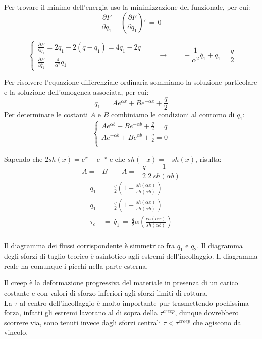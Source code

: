Per trovare il minimo dell'energia uso la minimizzazione del funzionale, per cui:
\begin{equation*}
    \frac{\partial F}{\partial q_1} - \left(  \frac{\partial F}{\partial \dot{q_1}} \right)'\,=\,0
\end{equation*}

\begin{equation*}
    \begin{cases}
          \frac{\partial F}{\partial q_1} = 2q_1-2(q-q_1)=4q_1-2q\\
           \frac{\partial F}{\partial \dot{q_1}}= \frac{4}{\alpha^2} \ddot{q_1} 
    \end{cases}
    \qquad \rightarrow\qquad
    -\frac{1}{\alpha^2} \ddot{q_1} +q_1= \frac{q}{2}
\end{equation*}

Per risolvere l'equazione differenziale ordinaria sommiamo la soluzione particolare e la soluzione dell'omogenea associata, per cui:
\begin{equation*}
    q_1\,=\,Ae^{\alpha x} +Be^{-\alpha x}+\frac{q}{2}
\end{equation*}
Per determinare le costanti $A$ e $B$ combiniamo le condizioni al contorno di $q_1$:
\begin{equation*}
    \begin{cases}
        Ae^{\alpha b} +Be^{-\alpha b}+\frac{q}{2}=q\\
        Ae^{-\alpha b} +Be^{\alpha b}+\frac{q}{2}=0\\
    \end{cases}
\end{equation*}

Sapendo che $2sh(x) = e^x-e^{-x}$ e che $sh(-x)=-sh(x)$, risulta:
\begin{equation*}
    A=-B \qquad A=-\frac{q}{2}\,\frac{1}{2\,sh(\alpha b)}
\end{equation*}
\begin{align*}
    q_1\,&=\,\frac{q}{2} \left(  1+\frac{sh(\alpha x)}{sh(\alpha b)}  \right)\\
     q_1\,&=\,\frac{q}{2} \left(  1-\frac{sh(\alpha x)}{sh(\alpha b)}  \right)\\
     \tau_c\,&=\, \dot{q_1}\,=\,\frac{q}{2} \alpha\left( \frac{ch(\alpha x)}{sh(\alpha b)}  \right)\\
\end{align*}

Il diagramma dei flussi corrispondente è simmetrico fra $q_1$ e $q_2$. Il diagramma degli sforzi di taglio teorico è asintotico agli estremi dell'incollaggio. Il diagramma reale ha comunque i picchi nella parte esterna.

Il creep è la deformazione progressiva del materiale in presenza di un carico costante e con valori di sforzo inferiori agli sforzi limiti di rottura.\\
La $\tau$ al centro dell'incollaggio è molto importante pur trasmettendo pochissima forza, infatti gli estremi lavorano al di sopra della $\tau^{creep}$, dunque dovrebbero scorrere via, sono tenuti invece dagli sforzi centrali $\tau<\tau^{creep}$ che agiscono da vincolo.
